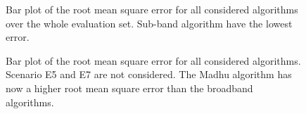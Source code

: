 \begin{figure}[!ht]
	\centering
	\begin{minipage}[t]{.49\textwidth}
		\def\svgwidth{1\linewidth}
		  \small
		\caption{Bar plot of the root mean square error for all considered algorithms over the whole evaluation set. Sub-band algorithm have the lowest error.}
		\label{fig:results_rmse}
	\end{minipage}%
	\hfill
	\begin{minipage}[t]{.49\textwidth}
		\centering
		\def\svgwidth{1\linewidth}
		\small
		\caption{Bar plot of the root mean square error for all considered algorithms. Scenario E5 and E7 are not considered. The Madhu algorithm has now a higher root mean square error than the broadband algorithms.}
		\label{fig:results_rmse2}
	\end{minipage}
\end{figure}

